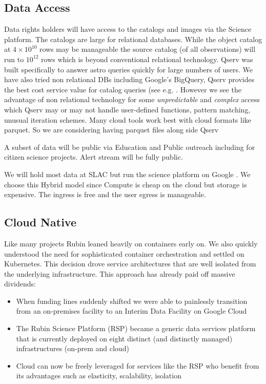 \documentclass[11pt,twoside]{article}
\begin{document}
\begin{centering}
\end{centering}


\subsection{Data Access} \label{sec:dataaccess}

Data rights holders will have access to the catalogs and images via the Science platform.
The catalogs are large for relational databases.
While the object catalog at $4 \times 10^{10}$ rows may be manageable
the source catalog (of all observations) will run to $ 10^{12}$ rows which is beyond conventional relational technology.
Qserv \citep{C15_adassxxxii} was built specifically to answer astro queries quickly for large numbers of users.
We have also tried non relational DBs including Google's BigQuery, Qserv provides the best cost service value for catalog queries (see e.g. \citet{Document-31100}.
However we see the advantage of non relational technology for
some  \emph{unpredictable} and \emph{complex} access which Qserv may or may not handle user-defined functions, pattern matching, unusual iteration schemes.
Many cloud tools work best with cloud formats like parquet.
So we are considering having parquet files along side Qserv

A subset of data will be public via Education and Public outreach including for citizen science projects.
Alert stream will be fully public.

We will hold most data at SLAC but run the science platform on Google \citep{2021arXiv211115030O}.
We choose this Hybrid model since Compute is cheap on the cloud but storage is expensive.
The ingress is free and the user egress is manageable.

\subsection{Cloud Native}\label{sec:cloudnative}
Like many projects \citep{2017ASPC..512...33O} Rubin leaned heavily on containers early on.
We also quickly understood the need for sophisticated container orchestration and settled on Kubernetes.
This decision drove service architectures that are well isolated from the underlying infrastructure.
This approach has already paid off massive dividends:

\begin{itemize}
\item When funding lines suddenly shifted we were able to painlessly transition from an on-premises facility to an Interim Data Facility on Google Cloud
\item The Rubin Science Platform (RSP) became a generic data services platform that is currently deployed on eight distinct (and distinctly managed) infrastructures (on-prem and cloud)
\item Cloud can now be freely leveraged for services like the RSP who benefit from its advantages such as elasticity, scalability, isolation
\end{itemize}
\end{document}
